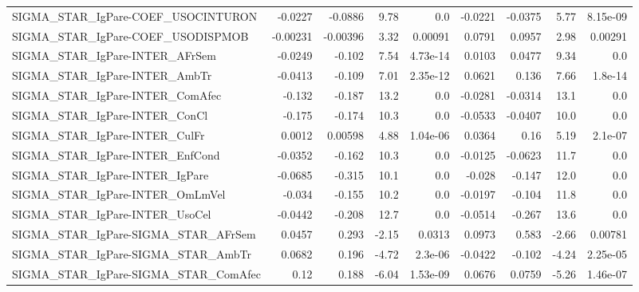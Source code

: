 \begin{tabular}{lrrrrrrrr}
SIGMA\_STAR\_IgPare-COEF\_USOCINTURON    &     -0.0227 &      -0.0886 &     9.78 &      0.0 &    -0.0221 &     -0.0375 &         5.77 &      8.15e-09 \\
SIGMA\_STAR\_IgPare-COEF\_USODISPMOB     &    -0.00231 &     -0.00396 &     3.32 &  0.00091 &     0.0791 &      0.0957 &         2.98 &       0.00291 \\
SIGMA\_STAR\_IgPare-INTER\_AFrSem        &     -0.0249 &       -0.102 &     7.54 & 4.73e-14 &     0.0103 &      0.0477 &         9.34 &           0.0 \\
SIGMA\_STAR\_IgPare-INTER\_AmbTr         &     -0.0413 &       -0.109 &     7.01 & 2.35e-12 &     0.0621 &       0.136 &         7.66 &       1.8e-14 \\
SIGMA\_STAR\_IgPare-INTER\_ComAfec       &      -0.132 &       -0.187 &     13.2 &      0.0 &    -0.0281 &     -0.0314 &         13.1 &           0.0 \\
SIGMA\_STAR\_IgPare-INTER\_ConCl         &      -0.175 &       -0.174 &     10.3 &      0.0 &    -0.0533 &     -0.0407 &         10.0 &           0.0 \\
SIGMA\_STAR\_IgPare-INTER\_CulFr         &      0.0012 &      0.00598 &     4.88 & 1.04e-06 &     0.0364 &        0.16 &         5.19 &       2.1e-07 \\
SIGMA\_STAR\_IgPare-INTER\_EnfCond       &     -0.0352 &       -0.162 &     10.3 &      0.0 &    -0.0125 &     -0.0623 &         11.7 &           0.0 \\
SIGMA\_STAR\_IgPare-INTER\_IgPare        &     -0.0685 &       -0.315 &     10.1 &      0.0 &     -0.028 &      -0.147 &         12.0 &           0.0 \\
SIGMA\_STAR\_IgPare-INTER\_OmLmVel       &      -0.034 &       -0.155 &     10.2 &      0.0 &    -0.0197 &      -0.104 &         11.8 &           0.0 \\
SIGMA\_STAR\_IgPare-INTER\_UsoCel        &     -0.0442 &       -0.208 &     12.7 &      0.0 &    -0.0514 &      -0.267 &         13.6 &           0.0 \\
SIGMA\_STAR\_IgPare-SIGMA\_STAR\_AFrSem   &      0.0457 &        0.293 &    -2.15 &   0.0313 &     0.0973 &       0.583 &        -2.66 &       0.00781 \\
SIGMA\_STAR\_IgPare-SIGMA\_STAR\_AmbTr    &      0.0682 &        0.196 &    -4.72 &  2.3e-06 &    -0.0422 &      -0.102 &        -4.24 &      2.25e-05 \\
SIGMA\_STAR\_IgPare-SIGMA\_STAR\_ComAfec  &        0.12 &        0.188 &    -6.04 & 1.53e-09 &     0.0676 &      0.0759 &        -5.26 &      1.46e-07 \\

\end{tabular}
